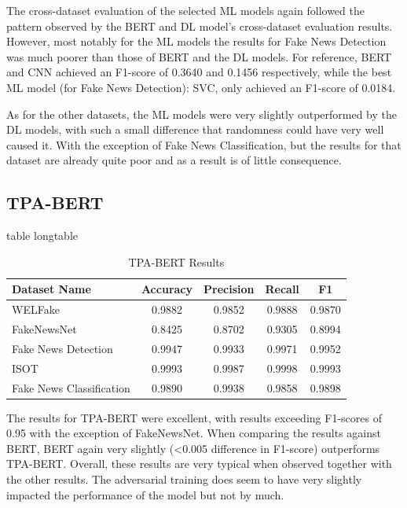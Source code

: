 \documentclass[stu,12pt,floatsintext,donotrepeattitle]{apa7}
\makeatletter
\let\origcaption\caption
\newcommand{\@tabletype}{table}
\newcommand{\@longtabletype}{longtable}
\DeclareRobustCommand{\caption}[2][]{%
    \ifx\relax#1\relax
      \origcaption{#2}%
      \def\temp@cap{#2}%
    \else
      \origcaption[#1]{#2}%
      \def\temp@cap{#1}%
    \fi
    \ifx\@captype\@tabletype
      \ifx\@currenvir\@longtabletype\else
        \addcontentsline{lot}{table}{\protect\numberline{\thetable}{\ignorespaces\temp@cap}}%
      \fi
    \fi
  }%
\let\oldcaption\caption
\renewcommand{\caption}[2][]{%
    \oldcaption[#1]{#2}%
    \vspace{-12pt}%
  }%
\makeatother
\begin{document}
The cross-dataset evaluation of the selected ML models again followed the pattern observed by the BERT and DL model's cross-dataset evaluation results. However, most notably for the ML models the results for Fake News Detection was much poorer than those of BERT and the DL models. For reference, BERT and CNN achieved an F1-score of 0.3640 and 0.1456 respectively, while the best ML model (for Fake News Detection): SVC, only achieved an F1-score of 0.0184. 

As for the other datasets, the ML models were very slightly outperformed by the DL models, with such a small difference that randomness could have very well caused it. With the exception of Fake News Classification, but the results for that dataset are already quite poor and as a result is of little consequence. 

\subsection{TPA-BERT}
\begin{table}[H]
    \centering
    \setlength{\tabcolsep}{3pt}
    \renewcommand{\arraystretch}{1.3}
    \caption{TPA-BERT Results}
    \label{tab:tpa_bert_results}
    \begin{tabular}{@{} l c c c c @{}}
        \toprule
        \textbf{Dataset Name} & \textbf{Accuracy} & \textbf{Precision} & \textbf{Recall} & \textbf{F1} \\
        \midrule
        WELFake & 0.9882 & 0.9852 & 0.9888 & 0.9870 \\
        FakeNewsNet & 0.8425 & 0.8702 & 0.9305 & 0.8994 \\
        Fake News Detection & 0.9947 & 0.9933 & 0.9971 & 0.9952 \\
        ISOT & 0.9993 & 0.9987 & 0.9998 & 0.9993 \\
        Fake News Classification & 0.9890 & 0.9938 & 0.9858 & 0.9898 \\
        \bottomrule
    \end{tabular}
\end{table}

The results for TPA-BERT were excellent, with results exceeding F1-scores of 0.95 with the exception of FakeNewsNet. When comparing the results against BERT, BERT again very slightly (\textless{}0.005 difference in F1-score) outperforms TPA-BERT. Overall, these results are very typical when observed together with the other results. The adversarial training does seem to have very slightly impacted the performance of the model but not by much. 
\end{document}
